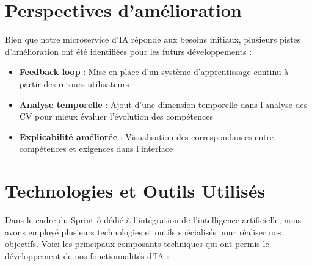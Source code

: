 \section{Perspectives d'amélioration}
Bien que notre microservice d'IA réponde aux besoins initiaux, plusieurs pistes d'amélioration ont été identifiées pour les futurs développements :

\begin{itemize}
    \item \textbf{Feedback loop} : Mise en place d'un système d'apprentissage continu à partir des retours utilisateurs
    \item \textbf{Analyse temporelle} : Ajout d'une dimension temporelle dans l'analyse des CV pour mieux évaluer l'évolution des compétences
    \item \textbf{Explicabilité améliorée} : Visualisation des correspondances entre compétences et exigences dans l'interface
\end{itemize}

\section{Technologies et Outils Utilisés}
Dans le cadre du Sprint 5 dédié à l'intégration de l'intelligence artificielle, nous avons employé plusieurs technologies et outils spécialisés pour réaliser nos objectifs. Voici les principaux composants techniques qui ont permis le développement de nos fonctionnalités d'IA :

